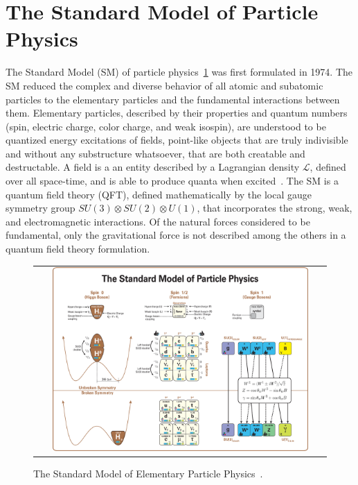 \section{The Standard Model of Particle Physics}
The Standard Model (SM) of particle physics~\ref{Standard_Model} was first formulated in 1974.
The SM reduced the complex and diverse behavior of all atomic and subatomic particles to the elementary particles and the fundamental interactions between them. 
Elementary particles, described by their properties and quantum numbers (spin, electric charge, color charge, and  weak isospin), are understood to be quantized energy excitations of fields, point-like objects that are truly indivisible and without any substructure whatsoever, that are both creatable and destructable.
A field is a an entity described by a Lagrangian density $\mathcal{L}$, defined over all space-time, and is able to produce quanta when excited~\cite{nagashima_2013_V1}.
The SM is a quantum field theory (QFT), defined mathematically by the local gauge symmetry group $SU(3) \otimes SU(2) \otimes U(1)$, that incorporates the strong, weak, and electromagnetic interactions.
Of the natural forces considered to be fundamental, only the gravitational force is not described among the others in a quantum field theory formulation.
\begin{figure}[!htb]
  \begin{center}
    \begin{tabular}{c}
        \includegraphics[width=0.90\textwidth]{fig_Theory/Standard_Model.png}
    \end{tabular}
    \caption{The Standard Model of Elementary Particle Physics~\cite{StandardModel}.
            }
    \label{Standard_Model}
  \end{center}
\end{figure}

